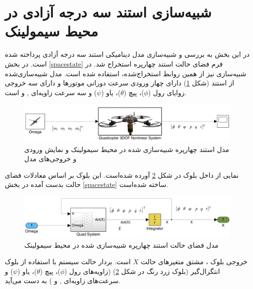 \section{شبیه‌سازی استند سه درجه آزادی در محیط سیمولینک}\label{quadall3}
در این بخش به بررسی و شبیه‌سازی مدل دینامیکی استند سه درجه آزادی پرداخته شده است. در بخش \ref{spacestate} فرم فضای حالت استند چهارپره استخراج شد. در شبیه‌سازی نیز از همین روابط استخراج‌شده، استفاده شده است. مدل شبیه‌سازی‌شده از استند (شکل \ref{quadsimulink}) دارای چهار ورودی سرعت دورانی موتورها  و دارای سه خروجی زوایای رول ($\phi$)، پیچ ($\theta$)، یاو ($\psi$) و  سه سرعت زاویه‌ای
 ,
 و 
 است.
 
 	\hspace*{0.5cm}
\begin{figure}[H]
	\includegraphics[width=16cm]{../Figures/QuadSimulation/Stand_Model.png}
	\centering
	\caption{مدل استند چهارپره شبیه‌سازی شده در محیط سیمولینک و نمایش ورودی و خروجی‌های مدل}
	\label{quadsimulink}
\end{figure}
نمایی از داخل بلوک
در شکل \ref{Quad3DOF} آورده شده‌است. این بلوک بر اساس معادلات فضای حالت بدست آمده در بخش
\ref{spacestate}
ساخته شده‌است.
	\hspace*{1.5cm}
\begin{figure}[H]
	\includegraphics[width=16cm]{../Figures/QuadSimulation/Integrator.png}
	\centering
	\caption{مدل فضای حالت استند چهارپره شبیه‌سازی شده در محیط سیمولینک}
	\label{Quad3DOF}
\end{figure}
خروجی بلوک
،
مشتق متغیرهای حالت 
$\dot X$
است. بردار حالت سیستم با استفاده از بلوک انتگرال‌گیر (بلوک زرد رنگ در شکل \ref{Quad3DOF})
 (زاویه‌های رول ($\phi$)، پیچ ($\theta$)، یاو ($\psi$) و سرعت‌های زاویه‌ای‌
 ,
و 
)
به دست می‌آید.

